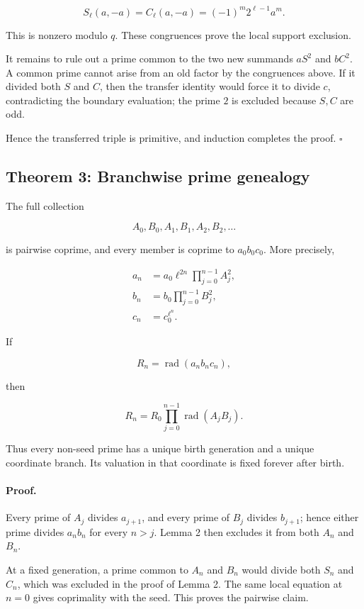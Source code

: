 \documentclass[11pt]{article}
\begin{document}
\[
S_\ell(a,-a)
=
C_\ell(a,-a)
=
(-1)^m2^{\ell-1}a^m.
\]

This is nonzero modulo \(q\). These congruences prove the local support
exclusion.

It remains to rule out a prime common to the two new summands \(aS^2\) and
\(bC^2\). A common prime cannot arise from an old factor by the
congruences above. If it divided both \(S\) and \(C\), then the transfer
identity would force it to divide \(c\), contradicting the boundary
evaluation; the prime \(2\) is excluded because \(S,C\) are odd.

Hence the transferred triple is primitive, and induction completes the
proof. \(\square\)

\subsection{Theorem 3: Branchwise prime genealogy}

The full collection

\[
A_0,B_0,A_1,B_1,A_2,B_2,\ldots
\]

is pairwise coprime, and every member is coprime to \(a_0b_0c_0\). More
precisely,

\[
\begin{aligned}
a_n
&=
a_0\ell^{2n}
\prod_{j=0}^{n-1}A_j^2,\\
b_n
&=
b_0
\prod_{j=0}^{n-1}B_j^2,\\
c_n
&=
c_0^{\ell^n}.
\end{aligned}
\]

If

\[
R_n=\operatorname{rad}(a_nb_nc_n),
\]

then

\[
\boxed{
R_n
=
R_0
\prod_{j=0}^{n-1}
\operatorname{rad}(A_jB_j).
}
\]

Thus every non-seed prime has a unique birth generation and a unique
coordinate branch. Its valuation in that coordinate is fixed forever
after birth.

\paragraph{Proof.}

Every prime of \(A_j\) divides \(a_{j+1}\), and every prime of \(B_j\)
divides \(b_{j+1}\); hence either prime divides \(a_nb_n\) for every
\(n>j\). Lemma 2 then excludes it from both \(A_n\) and \(B_n\).

At a fixed generation, a prime common to \(A_n\) and \(B_n\) would divide
both \(S_n\) and \(C_n\), which was excluded in the proof of Lemma 2. The
same local equation at \(n=0\) gives coprimality with the seed. This proves
the pairwise claim.
\end{document}
